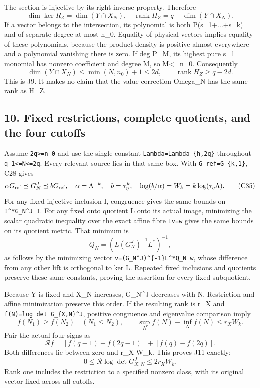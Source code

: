 \documentclass[11pt]{article}
\begin{document}
The section is injective by its right-inverse property. Therefore \[
\dim\ker R_Z=\dim(Y\cap X_N),\quad
\operatorname{rank}H_Z=q-\dim(Y\cap X_N).
\] If a vector belongs to the intersection, its polynomial is both P(s\_1+...+s\_k) and of separate degree at most n\_0. Equality of physical vectors implies equality of these polynomials, because the product density is positive almost everywhere and a polynomial vanishing there is zero. If deg P=M, its highest pure s\_1 monomial has nonzero coefficient and degree M, so M\textless=n\_0. Consequently \[
\dim(Y\cap X_N)\le\min(N,n_0)+1\le2d,
\qquad \operatorname{rank}H_Z\ge q-2d.
\tag{C34}
\] This is J9. It makes no claim that the value correction Omega\_N has the same rank as H\_Z.

\subsection{10. Fixed restrictions, complete quotients, and the four cutoffs}\label{fixed-restrictions-complete-quotients-and-the-four-cutoffs}

Assume \texttt{2q\textgreater{}=n\_0} and use the single constant \texttt{Lambda=Lambda\_\{h,2q\}} throughout \texttt{q-1\textless{}=N\textless{}=2q}. Every relevant source lies in that same box. With \texttt{G\_ref=G\_\{k,1\}}, C28 gives \[
\alpha G_{\rm ref}\preceq G_N^J\preceq bG_{\rm ref},
\quad \alpha=\Lambda^{-k},\quad b=\tau_\eta^k,
\quad \log(b/\alpha)=W_k=k\log(\tau_\eta\Lambda).
\tag{C35}
\] For any fixed injective inclusion I, congruence gives the same bounds on \texttt{I\^{}*G\_N\^{}J\ I}. For any fixed onto quotient L onto its actual image, minimizing the scalar quadratic inequality over the exact affine fibre \texttt{Lv=w} gives the same bounds on its quotient metric. That minimum is \[
Q_N=(L(G_N^J)^{-1}L^*)^{-1},
\] as follows by the minimizing vector \texttt{v=(G\_N\^{}J)\^{}\{-1\}L\^{}*Q\_N\ w}, whose difference from any other lift is orthogonal to ker L. Repeated fixed inclusions and quotients preserve these same constants, proving the assertion for every fixed subquotient.

Because Y is fixed and X\_N increases, G\_N\^{}J decreases with N. Restriction and affine minimization preserve this order. If the resulting rank is r\_X and \texttt{f(N)=log\ det\ G\_\{X,N\}\^{}J}, positive congruence and eigenvalue comparison imply \[
f(N_1)\ge f(N_2)\quad(N_1\le N_2),\qquad
\sup_Nf(N)-\inf_Nf(N)\le r_XW_k.
\] Pair the actual four signs as \[
\mathcal Rf=[f(q-1)-f(2q-1)]+[f(q)-f(2q)].
\] Both differences lie between zero and r\_X W\_k. This proves J11 exactly: \[
0\le\mathcal R\log\det G_{X,N}^J\le2r_XW_k.
\tag{C36}
\] Rank one includes the restriction to a specified nonzero class, with its original vector fixed across all cutoffs.
\end{document}
